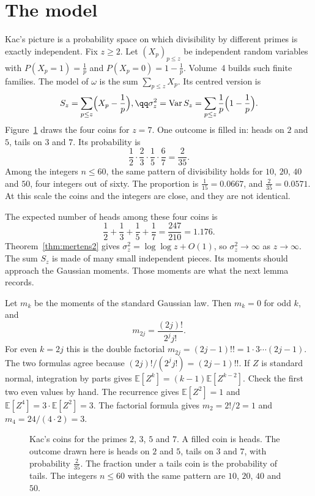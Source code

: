 \section{The model}

Kac's picture is a probability space on which divisibility by different primes is exactly independent. Fix $z\ge2$. Let $(X_p)_{p\le z}$ be independent random variables with $P(X_p=1)=\frac1p$ and $P(X_p=0)=1-\frac1p$. Volume~4 builds such finite families. The model of $\omega$ is the sum $\sum_{p\le z}X_p$. Its centred version is
\[
\begin{gathered}S_z=\sum_{p\le z}\Bigl(X_p-\frac1p\Bigr),\qq\sigma_z^2=\operatorname{Var}S_z=\sum_{p\le z}\frac1p\Bigl(1-\frac1p\Bigr).\end{gathered}
\]
Figure~\ref{fig:coincount} draws the four coins for $z=7$. One outcome is filled in: heads on $2$ and $5$, tails on $3$ and $7$. Its probability is
\[
\frac12\cdot\frac23\cdot\frac15\cdot\frac67=\frac2{35}.
\]
Among the integers $n\le 60$, the same pattern of divisibility holds for $10$, $20$, $40$ and $50$, four integers out of sixty. The proportion is $\frac1{15}=0.0667$, and $\frac2{35}=0.0571$. At this scale the coins and the integers are close, and they are not identical.

The expected number of heads among these four coins is
\[
\frac12+\frac13+\frac15+\frac17=\frac{247}{210}=1.176.
\]
Theorem~\ref{thm:mertens2} gives $\sigma_z^2=\log\log z+O(1)$, so $\sigma_z^2\to\infty$ as $z\to\infty$. The sum $S_z$ is made of many small independent pieces. Its moments should approach the Gaussian moments. Those moments are what the next lemma records.

Let $m_k$ be the moments of the standard Gaussian law. Then $m_k=0$ for odd $k$, and
\[
m_{2j}=\frac{(2j)!}{2^j j!}.
\]
For even $k=2j$ this is the double factorial $m_{2j}=(2j-1)!!=1\cdot 3\cdots(2j-1)$. The two formulas agree because $(2j)!/(2^j j!)=(2j-1)!!$. If $Z$ is standard normal, integration by parts gives $\mathbb E[Z^k]=(k-1)\mathbb E[Z^{k-2}]$. Check the first two even values by hand. The recurrence gives $\mathbb E[Z^2]=1$ and $\mathbb E[Z^4]=3\cdot\mathbb E[Z^2]=3$. The factorial formula gives $m_2=2!/2=1$ and $m_4=24/(4\cdot 2)=3$.

\begin{figure}[ht]
\centering
{}
\caption{Kac's coins for the primes $2$, $3$, $5$ and $7$. A filled coin is heads. The outcome drawn here is heads on $2$ and $5$, tails on $3$ and $7$, with probability $\frac2{35}$. The fraction under a tails coin is the probability of tails. The integers $n\le 60$ with the same pattern are $10$, $20$, $40$ and $50$.}
\label{fig:coincount}
\end{figure}

